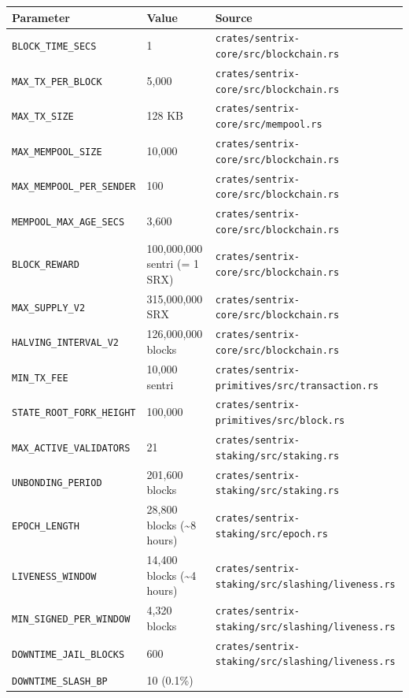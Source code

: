 \documentclass[11pt,a4paper]{article}
\begin{document}
\begin{longtable}[]{@{}lll@{}}
\toprule\noalign{}
Parameter & Value & Source \\
\midrule\noalign{}
\endhead
\bottomrule\noalign{}
\endlastfoot
\texttt{BLOCK\_TIME\_SECS} & 1 &
\texttt{crates/sentrix-core/src/blockchain.rs} \\
\texttt{MAX\_TX\_PER\_BLOCK} & 5,000 &
\texttt{crates/sentrix-core/src/blockchain.rs} \\
\texttt{MAX\_TX\_SIZE} & 128 KB &
\texttt{crates/sentrix-core/src/mempool.rs} \\
\texttt{MAX\_MEMPOOL\_SIZE} & 10,000 &
\texttt{crates/sentrix-core/src/blockchain.rs} \\
\texttt{MAX\_MEMPOOL\_PER\_SENDER} & 100 &
\texttt{crates/sentrix-core/src/blockchain.rs} \\
\texttt{MEMPOOL\_MAX\_AGE\_SECS} & 3,600 &
\texttt{crates/sentrix-core/src/blockchain.rs} \\
\texttt{BLOCK\_REWARD} & 100,000,000 sentri (= 1 SRX) &
\texttt{crates/sentrix-core/src/blockchain.rs} \\
\texttt{MAX\_SUPPLY\_V2} & 315,000,000 SRX &
\texttt{crates/sentrix-core/src/blockchain.rs} \\
\texttt{HALVING\_INTERVAL\_V2} & 126,000,000 blocks &
\texttt{crates/sentrix-core/src/blockchain.rs} \\
\texttt{MIN\_TX\_FEE} & 10,000 sentri &
\texttt{crates/sentrix-primitives/src/transaction.rs} \\
\texttt{STATE\_ROOT\_FORK\_HEIGHT} & 100,000 &
\texttt{crates/sentrix-primitives/src/block.rs} \\
\texttt{MAX\_ACTIVE\_VALIDATORS} & 21 &
\texttt{crates/sentrix-staking/src/staking.rs} \\
\texttt{UNBONDING\_PERIOD} & 201,600 blocks &
\texttt{crates/sentrix-staking/src/staking.rs} \\
\texttt{EPOCH\_LENGTH} & 28,800 blocks (\textasciitilde8 hours) &
\texttt{crates/sentrix-staking/src/epoch.rs} \\
\texttt{LIVENESS\_WINDOW} & 14,400 blocks (\textasciitilde4 hours) &
\texttt{crates/sentrix-staking/src/slashing/liveness.rs} \\
\texttt{MIN\_SIGNED\_PER\_WINDOW} & 4,320 blocks &
\texttt{crates/sentrix-staking/src/slashing/liveness.rs} \\
\texttt{DOWNTIME\_JAIL\_BLOCKS} & 600 &
\texttt{crates/sentrix-staking/src/slashing/liveness.rs} \\
\texttt{DOWNTIME\_SLASH\_BP} & 10 (0.1\%) &

\end{longtable}
\end{document}
